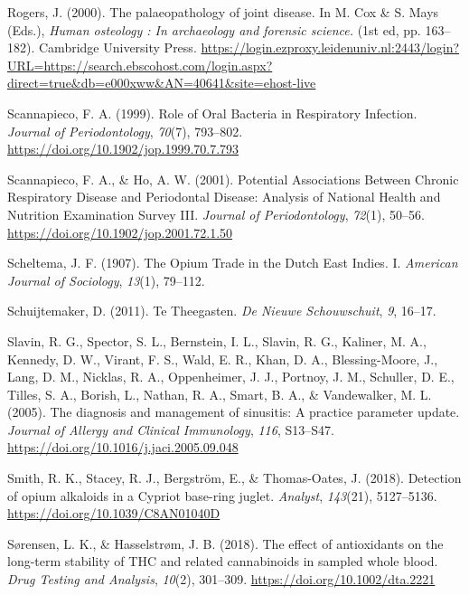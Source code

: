 \documentclass[
  11pt,
  leqno]{scrartcl}
\newlength{\cslhangindent}
\newenvironment{CSLReferences}[2] %
 {\begin{list}{}{%
  \setlength{\itemindent}{0pt}
  \setlength{\leftmargin}{0pt}
  \setlength{\parsep}{0pt}
  \ifodd #1
   \setlength{\leftmargin}{\cslhangindent}
   \setlength{\itemindent}{-1\cslhangindent}
  \fi
  \setlength{\itemsep}{#2\baselineskip}}}
 {\end{list}}
\begin{document}
\begin{CSLReferences}{1}{0}
Rogers, J. (2000). The palaeopathology of joint disease. In M. Cox \& S.
Mays (Eds.), \emph{Human osteology : {In} archaeology and forensic
science.} (1st ed, pp. 163--182). {Cambridge University Press}.
\url{https://login.ezproxy.leidenuniv.nl:2443/login?URL=https://search.ebscohost.com/login.aspx?direct=true&db=e000xww&AN=40641&site=ehost-live}

Scannapieco, F. A. (1999). Role of {Oral Bacteria} in {Respiratory
Infection}. \emph{Journal of Periodontology}, \emph{70}(7), 793--802.
\url{https://doi.org/10.1902/jop.1999.70.7.793}

Scannapieco, F. A., \& Ho, A. W. (2001). Potential {Associations Between
Chronic Respiratory Disease} and {Periodontal Disease}: {Analysis} of
{National Health} and {Nutrition Examination Survey III}. \emph{Journal
of Periodontology}, \emph{72}(1), 50--56.
\url{https://doi.org/10.1902/jop.2001.72.1.50}

Scheltema, J. F. (1907). The {Opium Trade} in the {Dutch East Indies}.
{I}. \emph{American Journal of Sociology}, \emph{13}(1), 79--112.

Schuijtemaker, D. (2011). Te Theegasten. \emph{De Nieuwe Schouwschuit},
\emph{9}, 16--17.

Slavin, R. G., Spector, S. L., Bernstein, I. L., Slavin, R. G., Kaliner,
M. A., Kennedy, D. W., Virant, F. S., Wald, E. R., Khan, D. A.,
Blessing-Moore, J., Lang, D. M., Nicklas, R. A., Oppenheimer, J. J.,
Portnoy, J. M., Schuller, D. E., Tilles, S. A., Borish, L., Nathan, R.
A., Smart, B. A., \& Vandewalker, M. L. (2005). The diagnosis and
management of sinusitis: {A} practice parameter update. \emph{Journal of
Allergy and Clinical Immunology}, \emph{116}, S13--S47.
\url{https://doi.org/10.1016/j.jaci.2005.09.048}

Smith, R. K., Stacey, R. J., Bergström, E., \& Thomas-Oates, J. (2018).
Detection of opium alkaloids in a {Cypriot} base-ring juglet.
\emph{Analyst}, \emph{143}(21), 5127--5136.
\url{https://doi.org/10.1039/C8AN01040D}

Sørensen, L. K., \& Hasselstrøm, J. B. (2018). The effect of
antioxidants on the long-term stability of {THC} and related
cannabinoids in sampled whole blood. \emph{Drug Testing and Analysis},
\emph{10}(2), 301--309. \url{https://doi.org/10.1002/dta.2221}


\end{CSLReferences}
\end{document}
